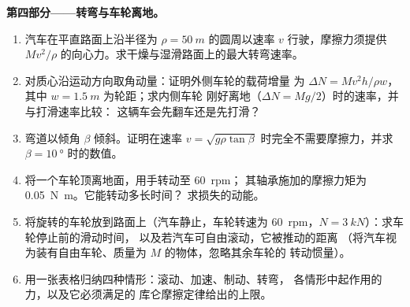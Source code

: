 \begin{problem}
\medskip
\noindent\textbf{第四部分——转弯与车轮离地。}
\begin{enumerate}[resume]
  \item 汽车在平直路面上沿半径为
        $\rho = \qty{50}{m}$ 的圆周以速率 $v$ 行驶，摩擦力须提供
        $Mv^2/\rho$ 的向心力。求干燥与湿滑路面上的最大转弯速率。
  \item 对质心沿运动方向取角动量：证明外侧车轮的载荷增量
        为 $\Delta N =
        Mv^2h/\rho w$，其中 $w = \qty{1.5}{m}$ 为轮距；求内侧车轮
        刚好离地（$\Delta N = Mg/2$）时的速率，并与打滑速率比较：
        这辆车会先翻车还是先打滑？
  \item 弯道以倾角 $\beta$ 倾斜。证明在速率
        $v = \sqrt{g\rho\tan\beta}$ 时完全不需要摩擦力，并求
        $\beta = \qty{10}{\degree}$ 时的数值。
  \item 将一个车轮顶离地面，用手转动至 \qty{60}{rpm}；
        其轴承施加的摩擦力矩为 \qty{0.05}{N.m}。它能转动多长时间？
        求损失的动能。
  \item 将旋转的车轮放到路面上（汽车静止，车轮转速为
        \qty{60}{rpm}，$N = \qty{3}{kN}$）：求车轮停止前的滑动时间，
        以及若汽车可自由滚动，它被推动的距离
        （将汽车视为装有自由车轮、质量为 $M$ 的物体，忽略其余车轮的
        转动惯量）。
  \item 用一张表格归纳四种情形：滚动、加速、制动、转弯，
        各情形中起作用的力，以及它必须满足的
        库仑摩擦定律给出的上限。
\end{enumerate}
\end{problem}

